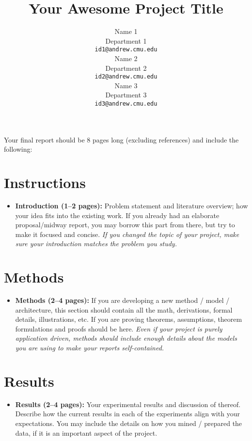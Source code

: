 \documentclass{article}
\title{Your Awesome Project Title}
\author{
  Name 1\\
  Department 1\\
  \texttt{id1@andrew.cmu.edu} \\
  \And
  Name 2 \\
  Department 2\\
  \texttt{id2@andrew.cmu.edu} \\
  \And
  Name 3\\
  Department 3\\
  \texttt{id3@andrew.cmu.edu} \\
}
\begin{document}
\maketitle

Your final report should be 8 pages long (excluding references) and include the following:

\section*{Instructions}



\begin{itemize}[leftmargin=2em]
    

    \item \textbf{Introduction (1--2 pages):}
    Problem statement and literature overview; how your idea fits into the existing work.
    If you already had an elaborate proposal/midway report, you may borrow this part from there, but try to make it focused and concise.
    \emph{If you changed the topic of your project, make sure your introduction matches the problem you study.}

\end{itemize}

\section*{Methods}

\begin{itemize}[leftmargin=2em]
 \item \textbf{Methods (2--4 pages):}
    If you are developing a new method / model / architecture, this section should contain all the math, derivations, formal details, illustrations, etc.
    If you are proving theorems, assumptions, theorem formulations and proofs should be here.
    \emph{Even if your project is purely application driven, methods should include enough details about the models you are using to make your reports self-contained.}	
\end{itemize}




\section*{Results}
\begin{itemize}[leftmargin=2em]
 \item \textbf{Results (2--4 pages):}
    Your experimental results and discussion of thereof.
    Describe how the current results in each of the experiments align with your expectations.
    You may include the details on how you mined / prepared the data, if it is an important aspect of the project.
\end{itemize}
\end{document}
